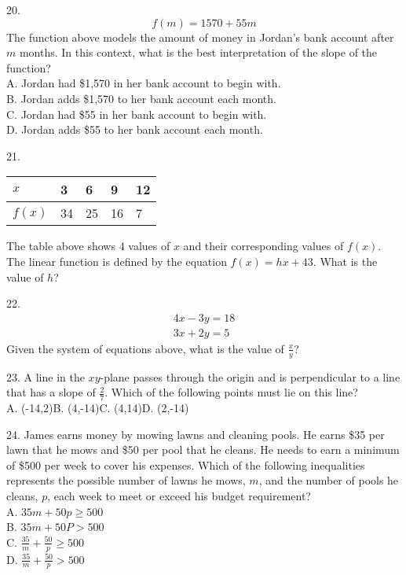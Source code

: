 \documentclass[../satmath.tex]{subfiles}
\begin{document}
20. 
\[f(m)=1570+55m\]
The function above models the amount of money in Jordan's bank account after $m$ months. In this context, what is the best interpretation 
of the slope of the function?\\
A. Jordan had \$1,570 in her bank account to begin with.\\
B. Jordan adds \$1,570 to her bank account each month.\\
C. Jordan had \$55 in her bank account to begin with.\\
D. Jordan adds \$55 to her bank account each month.
\medbreak

21. 
\begin{table}[h]
    \centering
    \begin{tabular}{|l|l|l|l|l|}
    \hline
    $x$ & 3 & 6 & 9 & 12 \\ \hline
    $f(x)$ & 34 & 25 & 16 & 7 \\ \hline
    \end{tabular}
\end{table}
The table above shows 4 values of $x$ and their corresponding values of $f(x)$. The linear function is defined by the equation $f(x)=hx+43$.
What is the value of $h$?
\medbreak

22. 
\begin{align*}
4x-3y=18\\
3x+2y=5
\end{align*}
Given the system of equations above, what is the value of $\frac{x}{y}$?
\medbreak

23. A line in the $xy$-plane passes through the origin and is perpendicular to a line that has a slope of $\frac{2}{7}$. Which of the 
following points must lie on this line?\\
A. (-14,2)\quad B. (4,-14)\quad C. (4,14)\quad D. (2,-14) 
\medbreak

24. James earns money by mowing lawns and cleaning pools. He earns \$35 per lawn that he mows and \$50 per pool that he cleans. He needs to earn a 
minimum of \$500 per week to cover his expenses. Which of the following inequalities represents the possible number of lawns he mows, $m$,
and the number of pools he cleans, $p$, each week to meet or exceed his budget requirement?\\
A. $35m+50p \geq 500$\\
B. $35m+50P > 500$\\
C. $\frac{35}{m}+\frac{50}{p}\geq 500$\\
D. $\frac{35}{m}+\frac{50}{p}>500$
\medbreak
\end{document}
